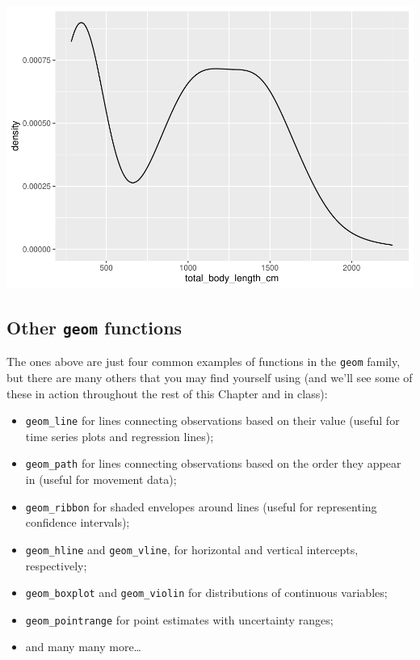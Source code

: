 \documentclass[
]{book}
\providecommand{\tightlist}{%
  \setlength{\itemsep}{0pt}\setlength{\parskip}{0pt}}
\begin{document}
\includegraphics{reproducible-science_files/figure-latex/gg5b-1.pdf}

\hypertarget{other-geom-functions}{%
\subsection{\texorpdfstring{Other \texttt{geom} functions}{Other geom functions}}\label{other-geom-functions}}

The ones above are just four common examples of functions in the \texttt{geom} family,
but there are many others that you may find yourself using (and we'll see some
of these in action throughout the rest of this Chapter and in class):

\begin{itemize}
\tightlist
\item
  \texttt{geom\_line} for lines connecting observations based on their value (useful for
  time series plots and regression lines);
\item
  \texttt{geom\_path} for lines connecting observations based on the order they appear
  in (useful for movement data);
\item
  \texttt{geom\_ribbon} for shaded envelopes around lines (useful for representing
  confidence intervals);
\item
  \texttt{geom\_hline} and \texttt{geom\_vline}, for horizontal and vertical intercepts,
  respectively;
\item
  \texttt{geom\_boxplot} and \texttt{geom\_violin} for distributions of continuous variables;
\item
  \texttt{geom\_pointrange} for point estimates with uncertainty ranges;
\item
  and many many more\ldots{}
\end{itemize}
\end{document}
